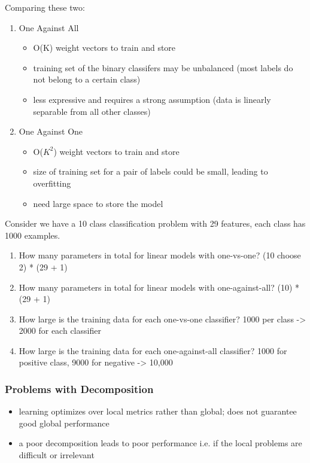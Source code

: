 \vspace*{.5cm}

Comparing these two:
\begin{enumerate}
    \item One Against All
    \begin{itemize}
        \item O(K) weight vectors to train and store
        \item training set of the binary classifers may be unbalanced (most labels do not belong to a certain class)
        \item less expressive and requires a strong assumption (data is linearly separable from all other classes)
    \end{itemize}
    \item One Against One
    \begin{itemize}
        \item O($K^2$) weight vectors to train and store
        \item size of training set for a pair of labels could be small, leading to overfitting
        \item need large space to store the model
    \end{itemize}
\end{enumerate}

\begin{example}
    
    Consider we have a 10 class classification problem with 29 features, each class has 1000 examples.

    \begin{enumerate}
        \item How many parameters in total for linear models with one-vs-one? (10 choose 2) * (29 + 1)
        \item How many parameters in total for linear models with one-against-all? (10) * (29 + 1)
        \item How large is the training data for each one-vs-one classifier? 1000 per class -> 2000 for each classifier
        \item How large is the training data for each one-against-all classifier? 1000 for positive class, 9000 for negative -> 10,000
    \end{enumerate}
\end{example}

\subsubsection*{Problems with Decomposition }
\begin{itemize}
    \item learning optimizes over local metrics rather than global; does not guarantee good global performance
    \item a poor decomposition leads to poor performance i.e. if the local problems are difficult or irrelevant
\end{itemize}

